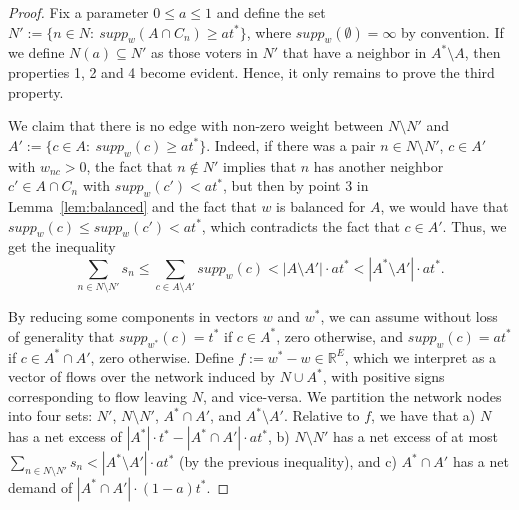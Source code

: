 \begin{proof}
Fix a parameter $0\leq a\leq 1$ and define the set $N':=\{n\in N: \ supp_w(A\cap C_n)\geq at^*\}$, where $supp_w(\emptyset)=\infty$ by convention. If we define $N(a)\subseteq N'$ as those voters in $N'$ that have a neighbor in $A^*\setminus A$, then properties 1, 2 and 4 become evident. Hence, it only remains to prove the third property.

We claim that there is no edge with non-zero weight between $N\setminus N'$ and $A':=\{c\in A: \ supp_w(c)\geq at^*\}$. 
Indeed, if there was a pair $n\in N\setminus N'$, $c\in A'$ with $w_{nc}>0$, the fact that $n\notin N'$ implies that $n$ has another neighbor $c'\in A\cap C_n$ with $supp_w(c')<at^*$, but then by point 3 in Lemma~\ref{lem:balanced} and the fact that $w$ is balanced for $A$, we would have that $supp_w(c)\leq supp_w(c')<at^*$, which contradicts the fact that $c\in A'$. Thus, we get the inequality
$$\sum_{n\in N\setminus N'} s_n \leq \sum_{c\in A\setminus A'} supp_w(c) < |A\setminus A'|\cdot at^*< |A^*\setminus A'|\cdot at^*.$$

By reducing some components in vectors $w$ and $w^*$, we can assume without loss of generality that $supp_{w^*}(c)=t^*$ if $c\in A^*$, zero otherwise, and $supp_{w}(c)=a t^*$ if $c\in A^*\cap A'$, zero otherwise. Define $f:=w^* - w\in\mathbb{R}^E$, which we interpret as a vector of flows over the network induced by $N\cup A^*$, with positive signs corresponding to flow leaving $N$, and vice-versa. We partition the network nodes into four sets: $N'$, $N\setminus N'$, $A^*\cap A'$, and $A^*\setminus A'$. Relative to $f$, we have that a) $N$ has a net excess of $|A^*|\cdot t^* - |A^*\cap A'|\cdot a t^*$, b) $N\setminus N'$ has a net excess of at most $\sum_{n\in N\setminus N'} s_n < |A^*\setminus A'|\cdot at^*$ (by the previous inequality), and c) $A^*\cap A'$ has a net demand of $|A^*\cap A'|\cdot (1-a) t^*$. 


\end{proof}
